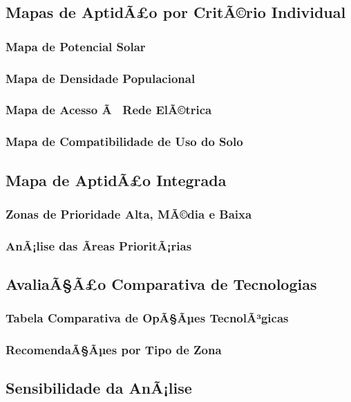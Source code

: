 \documentclass[12pt, a4paper]{article}
\begin{document}
\subsection{Mapas de AptidÃ£o por CritÃ©rio Individual}
\subsubsection{Mapa de Potencial Solar}
\subsubsection{Mapa de Densidade Populacional}
\subsubsection{Mapa de Acesso Ã  Rede ElÃ©trica}
\subsubsection{Mapa de Compatibilidade de Uso do Solo}

\subsection{Mapa de AptidÃ£o Integrada}
\subsubsection{Zonas de Prioridade Alta, MÃ©dia e Baixa}
\subsubsection{AnÃ¡lise das Ãreas PrioritÃ¡rias}

\subsection{AvaliaÃ§Ã£o Comparativa de Tecnologias}
\subsubsection{Tabela Comparativa de OpÃ§Ãµes TecnolÃ³gicas}
\subsubsection{RecomendaÃ§Ãµes por Tipo de Zona}

\subsection{Sensibilidade da AnÃ¡lise}
\end{document}
